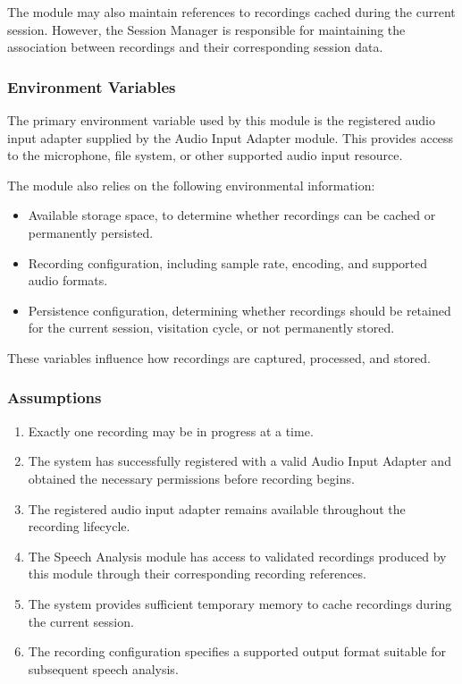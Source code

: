 \documentclass[12pt, titlepage]{article}
\begin{document}
The module may also maintain references to recordings cached during the current session. However, the Session Manager is responsible for maintaining the association between recordings and their corresponding session data.

\subsubsection{Environment Variables}

The primary environment variable used by this module is the registered audio input adapter supplied by the Audio Input Adapter module. This provides access to the microphone, file system, or other supported audio input resource.

The module also relies on the following environmental information:

\begin{itemize}
    \item Available storage space, to determine whether recordings can be cached or permanently persisted.
    \item Recording configuration, including sample rate, encoding, and supported audio formats.
    \item Persistence configuration, determining whether recordings should be retained for the current session, visitation cycle, or not permanently stored.
\end{itemize}

These variables influence how recordings are captured, processed, and stored.

\subsubsection{Assumptions}

\begin{enumerate}
    \item Exactly one recording may be in progress at a time.
    \item The system has successfully registered with a valid Audio Input Adapter and obtained the necessary permissions before recording begins.
    \item The registered audio input adapter remains available throughout the recording lifecycle.
    \item The Speech Analysis module has access to validated recordings produced by this module through their corresponding recording references.
    \item The system provides sufficient temporary memory to cache recordings during the current session.
    \item The recording configuration specifies a supported output format suitable for subsequent speech analysis.
\end{enumerate}
\end{document}
